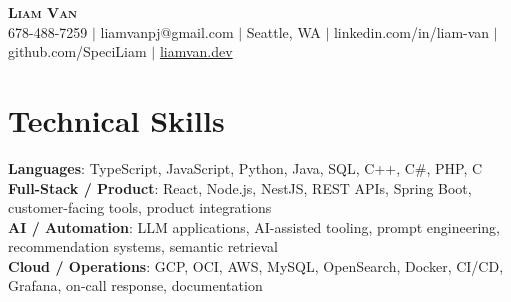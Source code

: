 \documentclass[letterpaper,11pt]{article}
\begin{document}

%
\begin{center}
    \textbf{\Huge \scshape Liam Van} \\ \vspace{1pt}
    \small 678-488-7259 $|$ \small {liamvanpj@gmail.com} $|$ Seattle, WA
 {{$|$ linkedin.com/in/liam-van} {$|$ github.com/SpeciLiam} {$|$ \href{https://liamvan.dev}{liamvan.dev}}}

\end{center}

\section{Technical Skills}
 \begin{itemize}[leftmargin=0.15in, label={}]
    \small{\item{
     \textbf{Languages}{: TypeScript, JavaScript, Python, Java, SQL, C++, C\#, PHP, C} \\
     \textbf{Full-Stack / Product}{: React, Node.js, NestJS, REST APIs, Spring Boot, customer-facing tools, product integrations} \\
     \textbf{AI / Automation}{: LLM applications, AI-assisted tooling, prompt engineering, recommendation systems, semantic retrieval} \\
     \textbf{Cloud / Operations}{: GCP, OCI, AWS, MySQL, OpenSearch, Docker, CI/CD, Grafana, on-call response, documentation} \\
    }}
 \end{itemize}
%
\end{document}
